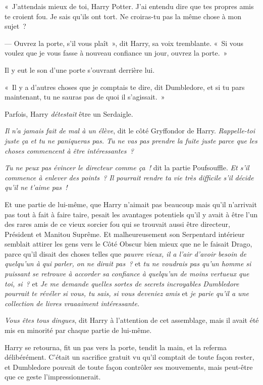 «~J'attendais mieux de toi, Harry Potter. J'ai entendu dire que tes propres amis te croient fou. Je sais qu'ils ont tort. Ne croiras-tu pas la même chose à mon sujet~?

--- Ouvrez la porte, s'il vous plaît~», dit Harry, sa voix tremblante. «~Si vous voulez que je vous fasse à nouveau confiance un jour, ouvrez la porte.~»

Il y eut le son d'une porte s'ouvrant derrière lui.

«~Il y a d'autres choses que je comptais te dire, dit Dumbledore, et si tu pars maintenant, tu ne sauras pas de quoi il s'agissait.~»

Parfois, Harry \emph{détestait} être un Serdaigle.

\emph{Il n'a jamais fait de mal à un élève}, dit le côté Gryffondor de Harry. \emph{Rappelle-toi juste ça et tu ne paniqueras pas. Tu ne vas pas prendre la fuite juste parce que les choses commencent à être intéressantes~?}

\emph{Tu ne peux pas évincer le directeur comme ça~!} dit la partie Poufsouffle. \emph{Et s'il commence à enlever des points~? Il pourrait rendre ta vie très difficile s'il décide qu'il ne t'aime pas~!}

Et une partie de lui-même, que Harry n'aimait pas beaucoup mais qu'il n'arrivait pas tout à fait à faire taire, pesait les avantages potentiels qu'il y avait à être l'un des rares amis de ce vieux sorcier fou qui se trouvait aussi être directeur, Président et Manitou Suprême. Et malheureusement son Serpentard intérieur semblait attirer les gens vers le Côté Obscur bien mieux que ne le faisait Drago, parce qu'il disait des choses telles que \emph{pauvre vieux, il a l'air d'avoir besoin de quelqu'un à qui parler, on ne dirait pas~?} et \emph{tu ne voudrais pas qu'un homme si puissant se retrouve à accorder sa confiance à quelqu'un de moins vertueux que toi, si~?} et \emph{Je me demande quelles sortes de secrets incroyables Dumbledore pourrait te révéler si vous, tu sais, si vous deveniez amis} et \emph{je parie qu'il a une collection de livres vraaaiment intéressante.}

\emph{Vous êtes tous dingues}, dit Harry à l'attention de cet assemblage, mais il avait été mis en minorité par chaque partie de lui-même.

Harry se retourna, fit un pas vers la porte, tendit la main, et la referma délibérément. C'était un sacrifice gratuit vu qu'il comptait de toute façon rester, et Dumbledore pouvait de toute façon contrôler ses mouvements, mais peut-être que ce geste l'impressionnerait.


